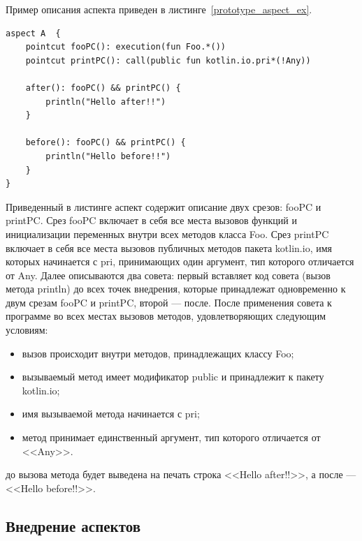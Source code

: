 \documentclass[conference]{IEEEtran}
\begin{document}
Пример описания аспекта приведен в листинге~\ref{prototype_aspect_ex}.
\begin{lstlisting}[label=prototype_aspect_ex,
    caption={Пример описания аспекта}]
aspect A  {
    pointcut fooPC(): execution(fun Foo.*())
    pointcut printPC(): call(public fun kotlin.io.pri*(!Any))

    after(): fooPC() && printPC() {
        println("Hello after!!")
    }

    before(): fooPC() && printPC() {
        println("Hello before!!")
    }
}
\end{lstlisting}
Приведенный в листинге аспект содержит описание двух срезов: fooPC и printPC.
Срез fooPC включает в себя все места вызовов функций и инициализации переменных
внутри всех методов класса Foo.
Срез printPC включает в себя все места вызовов публичных методов пакета
kotlin.io, имя которых начинается с pri, принимающих один аргумент, тип
которого отличается от Any.
Далее описываются два совета: первый вставляет код совета (вызов метода println) 
до всех точек внедрения, которые принадлежат одновременно к двум срезам fooPC и
printPC, второй --- после.
После применения совета к программе во всех местах вызовов методов,
удовлетворяющих следующим условиям:
\begin{itemize}
	\item вызов происходит внутри методов, принадлежащих классу Foo;
	\item вызываемый метод имеет модификатор public и принадлежит к пакету
		  kotlin.io;
	\item имя вызываемой метода начинается с pri;
	\item метод принимает единственный аргумент, тип которого отличается от
	      <<Any>>.
\end{itemize}
 до вызова метода будет выведена на печать строка <<Hello after!!>>, а после ---
<<Hello before!!>>.


\subsection{Внедрение аспектов}
\end{document}
